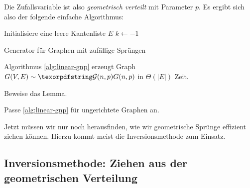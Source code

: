 \noindent Die Zufallsvariable ist also \emph{geometrisch verteilt} mit Parameter $p$.
Es ergibt sich also der folgende einfache Algorithmus:

\begin{algorithm}[H]
    Initialisiere eine leere Kantenliste $E$\;
    $k \gets -1$\;
    \caption{Generator für \Gnp Graphen mit zufällige Sprüngen}
    \label{alg:linear-gnp}
\end{algorithm}

\begin{lemma}
    \label{lem:linear-gnp}
    Algorithmus \ref{alg:linear-gnp} erzeugt Graph $G(V, E) \follows \Gnp$ in $\Theta(|E|)$ Zeit.
\end{lemma}

\begin{exercise}
    Beweise das Lemma.
\end{exercise}
\begin{exercise}
    Passe \cref{alg:linear-gnp} für ungerichtete Graphen an.
\end{exercise}

Jetzt müssen wir nur noch herausfinden, wie wir geometrische Sprünge effizient ziehen können.
Hierzu kommt meist die Inversionsmethode zum Einsatz.

\subsection{Inversionsmethode: Ziehen aus der geometrischen Verteilung}
\label{sec:inversionsmethode}


